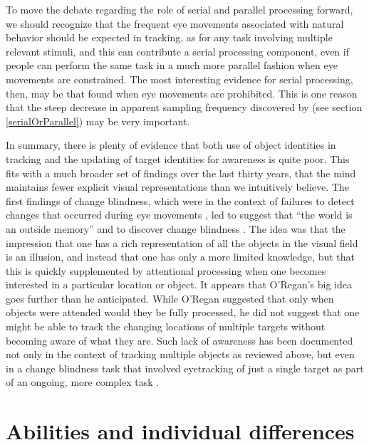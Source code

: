 \documentclass[
]{book}
\begin{document}
To move the debate regarding the role of serial and parallel processing forward, we should recognize that the frequent eye movements associated with natural behavior should be expected in tracking, as for any task involving multiple relevant stimuli, and this can contribute a serial processing component, even if people can perform the same task in a much more parallel fashion when eye movements are constrained. The most interesting evidence for serial processing, then, may be that found when eye movements are prohibited. This is one reason that the steep decrease in apparent sampling frequency discovered by \citet{holcombeSplittingAttentionReduces2013} (see section \ref{serialOrParallel}) may be very important.

In summary, there is plenty of evidence that both use of object identities in tracking and the updating of target identities for awareness is quite poor. This fits with a much broader set of findings over the last thirty years, that the mind maintains fewer explicit visual representations than we intuitively believe. The first findings of change blindness, which were in the context of failures to detect changes that occurred during eye movements \citep{mcconkieRoleControlEye1979}, led \citet{oreganSolvingRealMysteries1992a} to suggest that ``the world is an outside memory'' and to discover change blindness \citep{rensinkSeeNotSee1997}. The idea was that the impression that one has a rich representation of all the objects in the visual field is an illusion, and instead that one has only a more limited knowledge, but that this is quickly supplemented by attentional processing when one becomes interested in a particular location or object. It appears that O'Regan's big idea goes further than he anticipated. While O'Regan suggested that only when objects were attended would they be fully processed, he did not suggest that one might be able to track the changing locations of multiple targets without becoming aware of what they are. Such lack of awareness has been documented not only in the context of tracking multiple objects as reviewed above, but even in a change blindness task that involved eyetracking of just a single target as part of an ongoing, more complex task \citep{trieschWhatYouSee2003}.

\hypertarget{abilities}{%
\chapter{Abilities and individual differences}\label{abilities}}
\end{document}
